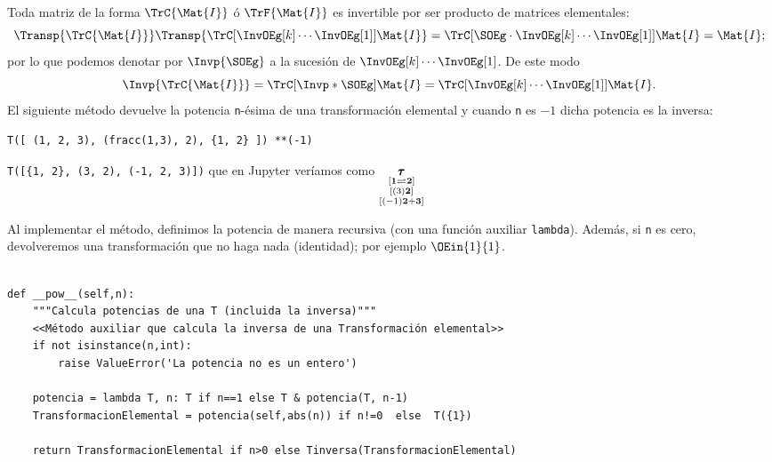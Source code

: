 \documentclass[11pt]{report}
\begin{document}
Toda matriz de la forma \(\TrC{\Mat{I}}\) ó \(\TrF{\Mat{I}}\) es
invertible por ser producto de matrices elementales:
\begin{displaymath}
  \Transp{\TrC{\Mat{I}}}\Transp{\TrC[\InvOEg[k]\cdots\InvOEg[1]]{\Mat{I}}}=
  \TrC[\SOEg\cdot\InvOEg[k]\cdots\InvOEg[1]]{\Mat{I}}=
  \Mat{I};
\end{displaymath}
por lo que podemos denotar por \(\Invp{\SOEg}\) a la sucesión de
\(\InvOEg[k]\cdots\InvOEg[1]\). De este modo
\begin{displaymath}
  \Invp{\TrC{\Mat{I}}}=
  \TrC[\Invp*{\SOEg}]{\Mat{I}}=
  \TrC[\InvOEg[k]\cdots\InvOEg[1]]{\Mat{I}}.
\end{displaymath}
El siguiente método devuelve la potencia \texttt{n}-ésima de una
transformación elemental y cuando \texttt{n} es \(-1\) dicha potencia es la
inversa:
\begin{verbatim}
T([ (1, 2, 3), (fracc(1,3), 2), {1, 2} ]) **(-1)
\end{verbatim}
\texttt{T([\{1, 2\}, (3, 2), (-1, 2, 3)])}
que en Jupyter veríamos como
\(\displaystyle \underset{\begin{subarray}{c} \left[\mathbf{1}\rightleftharpoons\mathbf{2}\right]\\\left[\left(3\right)\mathbf{2}\right]\\\left[\left(-1\right)\mathbf{2}+\mathbf{3} \right]\end{subarray}}{\pmb{\tau}}\)

Al implementar el método, definimos la potencia de manera recursiva
(con una función auxiliar \texttt{lambda}). Además, si \texttt{n} es cero,
devolveremos una transformación que no haga nada (identidad); por
ejemplo \(\OEin{1}{1}\).

\begin{verbatim}

def __pow__(self,n):
    """Calcula potencias de una T (incluida la inversa)"""
    <<Método auxiliar que calcula la inversa de una Transformación elemental>>    
    if not isinstance(n,int):
        raise ValueError('La potencia no es un entero')

    potencia = lambda T, n: T if n==1 else T & potencia(T, n-1)
    TransformacionElemental = potencia(self,abs(n)) if n!=0  else  T({1})
    
    return TransformacionElemental if n>0 else Tinversa(TransformacionElemental)
        
\end{verbatim}
\end{document}
